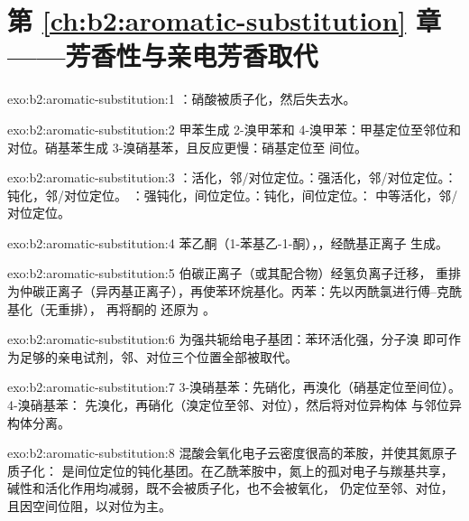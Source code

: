 \section*{第 \ref{ch:b2:aromatic-substitution} 章——芳香性与亲电芳香取代}

\begin{solution}{exo:b2:aromatic-substitution:1}
：硝酸被质子化，然后失去水。
\end{solution}

\begin{solution}{exo:b2:aromatic-substitution:2}
甲苯生成 2-溴甲苯和 4-溴甲苯：甲基定位至邻位和
对位。硝基苯生成 3-溴硝基苯，且反应更慢：硝基定位至
间位。
\end{solution}

\begin{solution}{exo:b2:aromatic-substitution:3}
：活化，邻/对位定位。：强活化，邻/对位定位。：钝化，邻/对位定位。
：强钝化，间位定位。：钝化，间位定位。：
中等活化，邻/对位定位。
\end{solution}

\begin{solution}{exo:b2:aromatic-substitution:4}
苯乙酮（1-苯基乙-1-酮），，经酰基正离子  生成。
\end{solution}

\begin{solution}{exo:b2:aromatic-substitution:5}
伯碳正离子（或其配合物）经氢负离子迁移，
重排为仲碳正离子（异丙基正离子），再使苯环烷基化。丙苯：先以丙酰氯进行傅–克酰基化（无重排），
再将酮的  还原为 。
\end{solution}

\begin{solution}{exo:b2:aromatic-substitution:6}
 为强共轭给电子基团：苯环活化强，分子溴
即可作为足够的亲电试剂，邻、对位三个位置全部被取代。
\end{solution}

\begin{solution}{exo:b2:aromatic-substitution:7}
3-溴硝基苯：先硝化，再溴化（硝基定位至间位）。4-溴硝基苯：
先溴化，再硝化（溴定位至邻、对位），然后将对位异构体
与邻位异构体分离。
\end{solution}

\begin{solution}{exo:b2:aromatic-substitution:8}
混酸会氧化电子云密度很高的苯胺，并使其氮原子质子化：
是间位定位的钝化基团。在乙酰苯胺中，氮上的孤对电子与羰基共享，
碱性和活化作用均减弱，既不会被质子化，也不会被氧化，
仍定位至邻、对位，且因空间位阻，以对位为主。
\end{solution}

